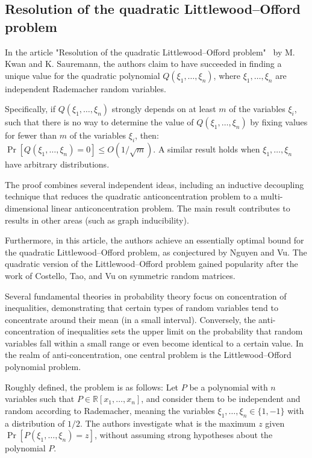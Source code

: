 \subsection{Resolution of the quadratic Littlewood--Offord problem}


In the article "Resolution of the quadratic Littlewood--Offord problem"~\cite{kwan2023resolution} by M. Kwan and K. Sauremann, the authors claim to have succeeded in finding a unique value for the quadratic polynomial $Q(\xi_1,\ldots,\xi_n)$, where $\xi_1,\ldots,\xi_n$ are independent Rademacher random variables.
 
Specifically, if $Q(\xi_1,\ldots,\xi_n)$ strongly depends on at least $m$ of the variables $\xi_i$, such that there is no way to determine the value of $Q(\xi_1,\ldots,\xi_n)$ by fixing values for fewer than $m$ of the variables $\xi_i$, then:
$\Pr[Q(\xi_1,\ldots,\xi_n) = 0] \leq O(1/\sqrt{m})$. A similar result holds when $\xi_1,\ldots,\xi_n$ have arbitrary distributions.
 
The proof combines several independent ideas, including an inductive decoupling technique that reduces the quadratic anticoncentration problem to a multi-dimensional linear anticoncentration problem.
\newline
The main result contributes to results in other areas (such as graph inducibility).
 
Furthermore, in this article, the authors achieve an essentially optimal bound for the quadratic Littlewood–Offord problem, as conjectured by Nguyen and Vu. The quadratic version of the Littlewood–Offord problem gained popularity after the work of Costello, Tao, and Vu on symmetric random matrices.
 
Several fundamental theories in probability theory focus on concentration of inequalities, demonstrating that certain types of random variables tend to concentrate around their mean (in a small interval). Conversely, the anti-concentration of inequalities sets the upper limit on the probability that random variables fall within a small range or even become identical to a certain value. In the realm of anti-concentration, one central problem is the Littlewood–Offord polynomial problem.
 
Roughly defined, the problem is as follows: Let $P$ be a polynomial with $n$ variables such that $P \in \mathbb{R}[x_1,\ldots,x_n]$, and consider them to be independent and random according to Rademacher, meaning the variables $\xi_1,\ldots,\xi_n \in \{1,-1\}$ with a distribution of $1/2$. The authors investigate what is the maximum $z$ given $\Pr[P(\xi_1,\ldots,\xi_n) = z]$, without assuming strong hypotheses about the polynomial $P$.
 
